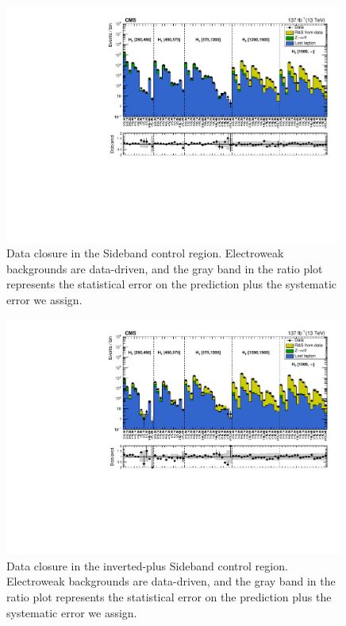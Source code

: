\begin{figure}[htbp]
  \begin{center}
    \includegraphics[width=0.99\textwidth]{figs/qcd/rs_data/comp_MT2SideBand.pdf}
    \caption{Data closure in the \mttwo Sideband control region. Electroweak backgrounds are data-driven, and the gray band in the ratio plot represents the statistical error on the prediction plus the systematic error we assign.}
    \label{Fig:rs_dataCR_MT2SideBand}
  \end{center}
\end{figure}

\begin{figure}[ht]
  \begin{center}
    \includegraphics[width=0.99\textwidth]{figs/qcd/rs_data/comp_DPhiMT2.pdf}
    \caption{Data closure in the inverted-\dpmin plus \mttwo Sideband control region. Electroweak backgrounds are data-driven, and the gray band in the ratio plot represents the statistical error on the prediction plus the systematic error we assign.}
    \label{Fig:rs_dataCR_DPhiMT2}
  \end{center}
\end{figure}

